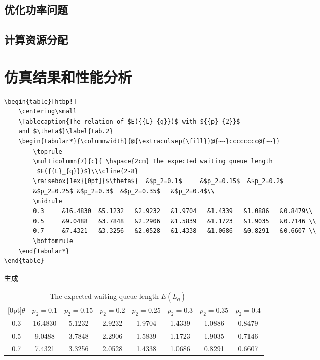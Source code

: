 \subsection{优化功率问题}\label{section3-3-3}

\subsection{计算资源分配}\label{section3-3-4}

\section{仿真结果和性能分析}\label{section3-4}
\begin{verbatim}
\begin{table}[htbp!]
	\centering\small
	\Tablecaption{The relation of $E({{L}_{q}})$ with ${{p}_{2}}$
    and $\theta$}\label{tab.2}
	\begin{tabular*}{\columnwidth}{@{\extracolsep{\fill}}@{~~}cccccccc@{~~}}
		\toprule
		\multicolumn{7}{c}{ \hspace{2cm} The expected waiting queue length
         $E({{L}_{q}})$}\\\cline{2-8}
		\raisebox{1ex}[0pt]{$\theta$}  &$p_2=0.1$     &$p_2=0.15$  &$p_2=0.2$
        &$p_2=0.25$ &$p_2=0.3$  &$p_2=0.35$   &$p_2=0.4$\\
		\midrule
		0.3     &16.4830  &5.1232   &2.9232   &1.9704   &1.4339   &1.0886   &0.8479\\
		0.5     &9.0488   &3.7848   &2.2906   &1.5839   &1.1723   &1.9035   &0.7146 \\
		0.7     &7.4321   &3.3256   &2.0528   &1.4338   &1.0686   &0.8291   &0.6607 \\
		\bottomrule
	\end{tabular*}	
\end{table}
\end{verbatim}
生成
\begin{table}[htbp!]
	\centering\small
	\label{tab.2}
	\begin{tabular*}{\columnwidth}{@{\extracolsep{\fill}}@{~~}cccccccc@{~~}}
		\toprule
		\multicolumn{7}{c}{ \hspace{2cm} The expected waiting queue length $E({{L}_{q}})$}\\
		\cline{2-8}
		\raisebox{1ex}[0pt]{$\theta$}  &$p_2=0.1$     &$p_2=0.15$  &$p_2=0.2$   &$p_2=0.25$
        &$p_2=0.3$  &$p_2=0.35$   &$p_2=0.4$\\
		\midrule
		0.3     &16.4830  &5.1232   &2.9232   &1.9704   &1.4339   &1.0886   &0.8479\\
		0.5     &9.0488   &3.7848   &2.2906   &1.5839   &1.1723   &1.9035   &0.7146 \\
		0.7     &7.4321   &3.3256   &2.0528   &1.4338   &1.0686   &0.8291   &0.6607 \\
		\bottomrule
	\end{tabular*}	
\end{table}

